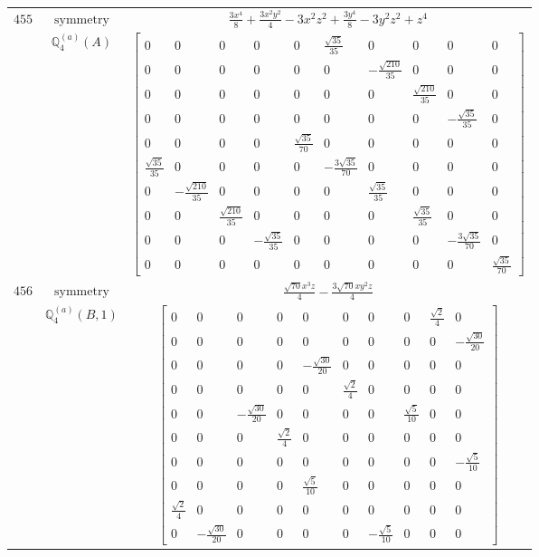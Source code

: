 \documentclass[fleqn,8pt,landscape]{jsarticle}
\begin{document}
\begin{longtable}{ccc}
$ 455 $ & $ \text{symmetry} $ & $ \frac{3 x^{4}}{8} + \frac{3 x^{2} y^{2}}{4} - 3 x^{2} z^{2} + \frac{3 y^{4}}{8} - 3 y^{2} z^{2} + z^{4} $ \\
$  $ & $ \mathbb{Q}_{4}^{(a)}(A) $ & $ \begin{bmatrix} 0 & 0 & 0 & 0 & 0 & \frac{\sqrt{35}}{35} & 0 & 0 & 0 & 0 \\ 0 & 0 & 0 & 0 & 0 & 0 & - \frac{\sqrt{210}}{35} & 0 & 0 & 0 \\ 0 & 0 & 0 & 0 & 0 & 0 & 0 & \frac{\sqrt{210}}{35} & 0 & 0 \\ 0 & 0 & 0 & 0 & 0 & 0 & 0 & 0 & - \frac{\sqrt{35}}{35} & 0 \\ 0 & 0 & 0 & 0 & \frac{\sqrt{35}}{70} & 0 & 0 & 0 & 0 & 0 \\ \frac{\sqrt{35}}{35} & 0 & 0 & 0 & 0 & - \frac{3 \sqrt{35}}{70} & 0 & 0 & 0 & 0 \\ 0 & - \frac{\sqrt{210}}{35} & 0 & 0 & 0 & 0 & \frac{\sqrt{35}}{35} & 0 & 0 & 0 \\ 0 & 0 & \frac{\sqrt{210}}{35} & 0 & 0 & 0 & 0 & \frac{\sqrt{35}}{35} & 0 & 0 \\ 0 & 0 & 0 & - \frac{\sqrt{35}}{35} & 0 & 0 & 0 & 0 & - \frac{3 \sqrt{35}}{70} & 0 \\ 0 & 0 & 0 & 0 & 0 & 0 & 0 & 0 & 0 & \frac{\sqrt{35}}{70} \end{bmatrix} $ \\ \hline
$ 456 $ & $ \text{symmetry} $ & $ \frac{\sqrt{70} x^{3} z}{4} - \frac{3 \sqrt{70} x y^{2} z}{4} $ \\
$  $ & $ \mathbb{Q}_{4}^{(a)}(B,1) $ & $ \begin{bmatrix} 0 & 0 & 0 & 0 & 0 & 0 & 0 & 0 & \frac{\sqrt{2}}{4} & 0 \\ 0 & 0 & 0 & 0 & 0 & 0 & 0 & 0 & 0 & - \frac{\sqrt{30}}{20} \\ 0 & 0 & 0 & 0 & - \frac{\sqrt{30}}{20} & 0 & 0 & 0 & 0 & 0 \\ 0 & 0 & 0 & 0 & 0 & \frac{\sqrt{2}}{4} & 0 & 0 & 0 & 0 \\ 0 & 0 & - \frac{\sqrt{30}}{20} & 0 & 0 & 0 & 0 & \frac{\sqrt{5}}{10} & 0 & 0 \\ 0 & 0 & 0 & \frac{\sqrt{2}}{4} & 0 & 0 & 0 & 0 & 0 & 0 \\ 0 & 0 & 0 & 0 & 0 & 0 & 0 & 0 & 0 & - \frac{\sqrt{5}}{10} \\ 0 & 0 & 0 & 0 & \frac{\sqrt{5}}{10} & 0 & 0 & 0 & 0 & 0 \\ \frac{\sqrt{2}}{4} & 0 & 0 & 0 & 0 & 0 & 0 & 0 & 0 & 0 \\ 0 & - \frac{\sqrt{30}}{20} & 0 & 0 & 0 & 0 & - \frac{\sqrt{5}}{10} & 0 & 0 & 0 \end{bmatrix} $ \\ \hline

\end{longtable}
\end{document}
